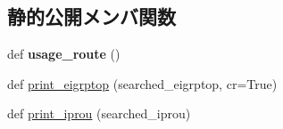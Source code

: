 \subsection*{静的公開メンバ関数}
\begin{DoxyCompactItemize}
\item 
\mbox{\label{classCiscoConf_1_1CiscoRoute_ad53b0d4b81d5be536af2f36330867cce}} 
def {\bfseries usage\+\_\+route} ()
\item 
def \mbox{\hyperlink{classCiscoConf_1_1CiscoRoute_aa9983974c890f778cc4380f8caaede02}{print\+\_\+eigrptop}} (searched\+\_\+eigrptop, cr=True)
\item 
def \mbox{\hyperlink{classCiscoConf_1_1CiscoRoute_add265b5db1840c18bd24a65d14c0a0bd}{print\+\_\+iprou}} (searched\+\_\+iprou)
\end{DoxyCompactItemize}
